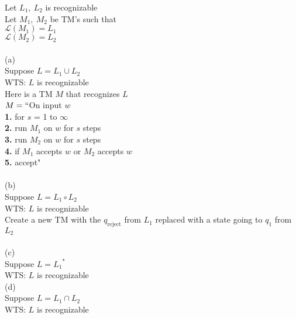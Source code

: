 \documentclass[preview]{standalone} %
\begin{document}
Let $L_1,\ L_2$ is recognizable\\
Let $M_1,\ M_2$ be TM's such that\\
$\mathcal{L}(M_1) = L_1$\\
$\mathcal{L}(M_2) = L_2$\\\\

(a)\\
Suppose $L = L_1 \cup L_2$\\
WTS: $L$ is recognizable\\

Here is a TM $M$ that recognizes $L$\\
$M=``$On input $w$\\
\hspace*{8mm} \textbf{1.} for $s$ = 1 to $\infty$\\
\hspace*{8mm} \textbf{2.} \qquad run $M_1$ on $w$ for $s$ steps\\
\hspace*{8mm} \textbf{3.} \qquad run $M_2$ on $w$ for $s$ steps\\
\hspace*{8mm} \textbf{4.} \qquad if $M_1$ accepts $w$ or $M_2$ accepts $w$\\
\hspace*{8mm} \textbf{5.} \qquad \qquad accept"\\\\

(b)\\
Suppose $L = L_1 \circ  L_2$\\
WTS: $L$ is recognizable\\

Create a new TM with the $q_{\text{reject}}$ from $L_1$ replaced with a state going to $q_1$ from $L_2$\\\\

(c)\\
Suppose $L = {L_1}^*$\\
WTS: $L$ is recognizable\\

(d)\\
Suppose $L = L_1 \cap L_2$\\
WTS: $L$ is recognizable\\
\end{document}
